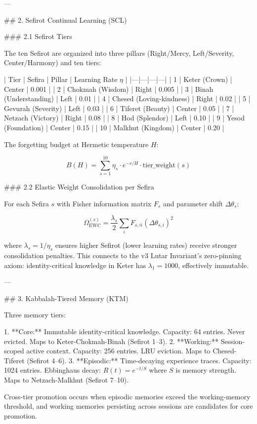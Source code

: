 ---

## 2. Sefirot Continual Learning (SCL)

### 2.1 Sefirot Tiers

The ten Sefirot are organized into three pillars (Right/Mercy, Left/Severity, Center/Harmony) and ten tiers:

| Tier | Sefira | Pillar | Learning Rate \( \eta \) |
|---|---|---|---|
| 1 | Keter (Crown) | Center | 0.001 |
| 2 | Chokmah (Wisdom) | Right | 0.005 |
| 3 | Binah (Understanding) | Left | 0.01 |
| 4 | Chesed (Loving-kindness) | Right | 0.02 |
| 5 | Gevurah (Severity) | Left | 0.03 |
| 6 | Tiferet (Beauty) | Center | 0.05 |
| 7 | Netzach (Victory) | Right | 0.08 |
| 8 | Hod (Splendor) | Left | 0.10 |
| 9 | Yesod (Foundation) | Center | 0.15 |
| 10 | Malkhut (Kingdom) | Center | 0.20 |

The forgetting budget at Hermetic temperature \( H \):

\[
B(H) = \sum_{s=1}^{10} \eta_s \cdot e^{-s/H} \cdot \text{tier\_weight}(s)
\]

### 2.2 Elastic Weight Consolidation per Sefira

For each Sefira \( s \) with Fisher information matrix \( F_s \) and parameter shift \( \Delta\theta_s \):

\[
\Omega_{\text{EWC}}^{(s)} = \frac{\lambda_s}{2} \sum_i F_{s,ii} (\Delta\theta_{s,i})^2
\]

where \( \lambda_s = 1/\eta_s \) ensures higher Sefirot (lower learning rates) receive stronger consolidation penalties. This connects to the v3 Lutar Invariant's zero-pinning axiom: identity-critical knowledge in Keter has \( \lambda_1 = 1000 \), effectively immutable.

---

## 3. Kabbalah-Tiered Memory (KTM)

Three memory tiers:

1. **Core:** Immutable identity-critical knowledge. Capacity: 64 entries. Never evicted. Maps to Keter-Chokmah-Binah (Sefirot 1--3).
2. **Working:** Session-scoped active context. Capacity: 256 entries. LRU eviction. Maps to Chesed-Tiferet (Sefirot 4--6).
3. **Episodic:** Time-decaying experience traces. Capacity: 1024 entries. Ebbinghaus decay: \( R(t) = e^{-t/S} \) where \( S \) is memory strength. Maps to Netzach-Malkhut (Sefirot 7--10).

Cross-tier promotion occurs when episodic memories exceed the working-memory threshold, and working memories persisting across sessions are candidates for core promotion.

